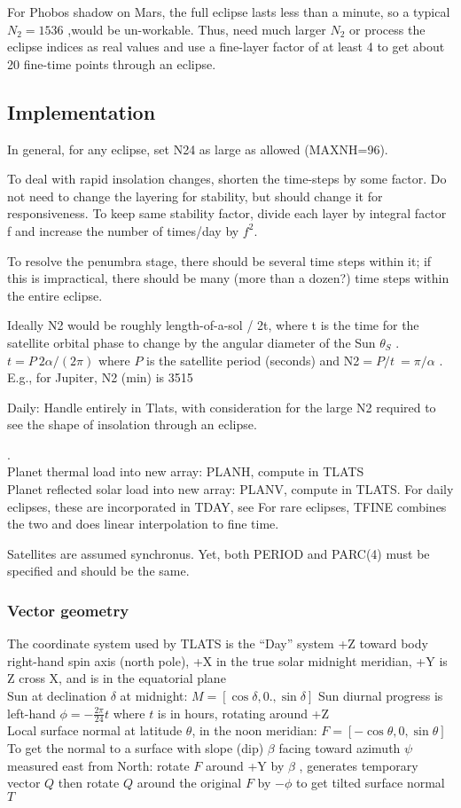 \documentclass{article}
\begin{document}
For Phobos shadow on Mars, the full eclipse lasts less than a minute, so a
typical $N_2=1536$ ,would be un-workable. Thus, need much larger $N_2$ or
process the eclipse indices as real values and use a fine-layer factor of at least 4
 to get about 20 fine-time points through an eclipse.

\subsection{Implementation}
In general, for any eclipse, set N24 as large as allowed (MAXNH=96).

 To deal with rapid insolation changes, shorten the time-steps by some
 factor. Do not need to change the layering for stability, but should change it
 for responsiveness. To keep same stability factor, divide each layer by
 integral factor f and increase the number of times/day by $f^2$.

To resolve the penumbra stage, there should be several time steps within it; if
this is impractical, there should be many (more than a dozen?) time steps within
the entire eclipse.

 Ideally N2 would be roughly length-of-a-sol / 2t, where t is the time for
 the satellite orbital phase to change by the angular diameter of the Sun
 $\theta_S$ . $t=P \ 2\alpha /(2 \pi)$ where $P$ is the satellite period (seconds) and N2$=P/t \ = \pi/\alpha$ . E.g., for Jupiter, N2 (min) is 3515

Daily: Handle entirely in Tlats, with consideration for the large N2 required to
see the shape of insolation through an eclipse.

. \\ Planet thermal load into new array: PLANH, compute in TLATS 
\\ Planet reflected solar load into new array: PLANV, compute in TLATS.
\qi For daily eclipses, these are incorporated in TDAY, see 
\qi For rare eclipses, TFINE combines the two and does linear interpolation to fine time.

Satellites are assumed synchronus. Yet, both PERIOD and PARC(4) must be
specified and should be the same.

\subsubsection{Vector geometry}
 The coordinate system used by TLATS is the ``Day'' system
\qi +Z toward body right-hand spin axis (north pole),
\qi +X in the true solar midnight meridian,
\qi +Y is Z cross X, and is in the equatorial plane
\\ Sun at declination $\delta$ at midnight: $M=[ \cos \delta, 0., \sin \delta]$
\qi Sun diurnal progress is left-hand   $\phi=- \frac{2 \pi}{24} t$ where $t$ is in hours, rotating around +Z
\\ Local surface normal at latitude $\theta$, in the noon meridian: $F =[ -\cos \theta, 0, \sin \theta]$
\\ To get the normal to a surface with slope (dip) $\beta$ facing toward azimuth $\psi$ measured east from North:
 \qi rotate $F$ around +Y by $\beta$ , generates temporary vector $Q$
\qi  then rotate $Q$ around the original $F$ by $-\phi$ to get tilted surface normal  $T$
\end{document}
